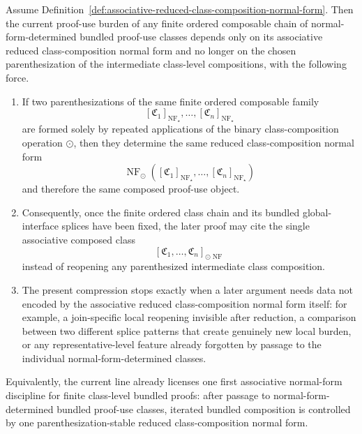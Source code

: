 \begin{proposition}
\label{prop:first-associative-proof-use-class-normal-form-principle}
Assume Definition~\ref{def:associative-reduced-class-composition-normal-form}. Then the current proof-use burden of any finite ordered composable chain of normal-form-determined bundled proof-use classes depends only on its associative reduced class-composition normal form and no longer on the chosen parenthesization of the intermediate class-level compositions, with the following force.
\begin{enumerate}[leftmargin=2em,label=(\roman*)]
\item If two parenthesizations of the same finite ordered composable family
\[
[\mathfrak C_1]_{\operatorname{NF}_{\star}},\dots,[\mathfrak C_n]_{\operatorname{NF}_{\star}}
\]
are formed solely by repeated applications of the binary class-composition operation \(\odot\), then they determine the same reduced class-composition normal form
\[
\operatorname{NF}_{\odot}([\mathfrak C_1]_{\operatorname{NF}_{\star}},\dots,[\mathfrak C_n]_{\operatorname{NF}_{\star}})
\]
and therefore the same composed proof-use object.
\item Consequently, once the finite ordered class chain and its bundled global-interface splices have been fixed, the later proof may cite the single associative composed class
\[
[\mathfrak C_1,\dots,\mathfrak C_n]_{\odot\operatorname{NF}}
\]
instead of reopening any parenthesized intermediate class composition.
\item The present compression stops exactly when a later argument needs data not encoded by the associative reduced class-composition normal form itself: for example, a join-specific local reopening invisible after reduction, a comparison between two different splice patterns that create genuinely new local burden, or any representative-level feature already forgotten by passage to the individual normal-form-determined classes.
\end{enumerate}
Equivalently, the current line already licenses one first associative normal-form discipline for finite class-level bundled proofs: after passage to normal-form-determined bundled proof-use classes, iterated bundled composition is controlled by one parenthesization-stable reduced class-composition normal form.
\end{proposition}

